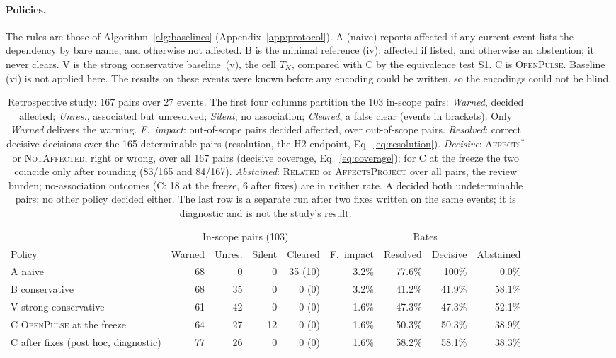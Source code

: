 \documentclass[11pt,a4paper]{article}
\newcommand{\op}{\textsc{OpenPulse}}
\begin{document}
\paragraph{Policies.} The rules are those of
Algorithm~\ref{alg:baselines} (Appendix~\ref{app:protocol}). A (naive)
reports affected if any current event lists the dependency by bare
name, and otherwise not affected. B is the minimal reference (iv):
affected if listed, and otherwise an abstention; it never clears. V is
the strong conservative baseline~(v), the cell $T_K$, compared with C
by the equivalence test S1. C is \op{}. Baseline (vi) is not applied
here. The results on
these events were known before any encoding could be written, so the
encodings could not be blind.

\begin{table}[t]
\centering
\footnotesize
\setlength{\tabcolsep}{3pt}
\begin{tabularx}{\linewidth}{@{}X r r r r r r r r@{}}
\toprule
 & \multicolumn{4}{c}{In-scope pairs (103)} & \multicolumn{4}{c}{Rates} \\
\cmidrule(lr){2-5}\cmidrule(l){6-9}
Policy & Warned & Unres. & Silent & Cleared & F.\ impact & Resolved & Decisive & Abstained \\
\midrule
A naive & 68 & 0 & 0 & 35 (10) & 3.2\% & 77.6\% & 100\% & 0.0\% \\
B conservative & 68 & 35 & 0 & 0 (0) & 3.2\% & 41.2\% & 41.9\% & 58.1\% \\
V strong conservative & 61 & 42 & 0 & 0 (0) & 1.6\% & 47.3\% & 47.3\% & 52.1\% \\
C \op{} at the freeze & 64 & 27 & 12 & 0 (0) & 1.6\% & 50.3\% & 50.3\% & 38.9\% \\
\midrule
C after fixes (post hoc, diagnostic) & 77 & 26 & 0 & 0 (0) & 1.6\% & 58.2\% & 58.1\% & 38.3\% \\
\bottomrule
\end{tabularx}
\caption{Retrospective study: 167 pairs over 27 events. The first four
columns partition the 103 in-scope pairs: \emph{Warned}, decided
affected; \emph{Unres.}, associated but unresolved; \emph{Silent}, no
association; \emph{Cleared}, a false clear (events in brackets). Only
\emph{Warned} delivers the warning. \emph{F.\ impact}: out-of-scope
pairs decided affected, over out-of-scope pairs. \emph{Resolved}:
correct decisive decisions over the 165 determinable pairs
(resolution, the H2 endpoint, Eq.~\ref{eq:resolution}).
\emph{Decisive}: \textsc{Affects}$^{*}$ or \textsc{NotAffected}, right
or wrong, over all 167 pairs (decisive coverage,
Eq.~\ref{eq:coverage}); for C at the freeze the two coincide only
after rounding (83/165 and 84/167). \emph{Abstained}:
\textsc{Related} or \textsc{AffectsProject} over all pairs, the
review burden; no-association outcomes (C: 18 at the freeze, 6 after
fixes) are in neither rate. A decided both undeterminable pairs; no
other policy decided either. The
last row is a separate run after two fixes written on the same events;
it is diagnostic and is not the study's result.}
\label{tab:retro}
\end{table}
\end{document}
